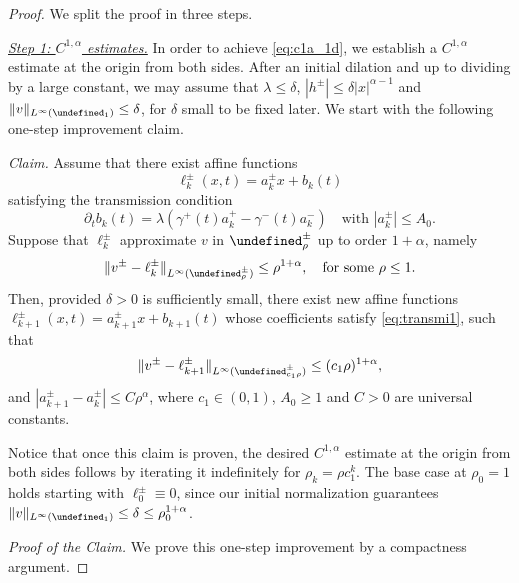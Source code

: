 \documentclass[12pt]{article}
\let\P\undefined
\numberwithin{Theorem}{section}
\theoremstyle{definition}
\theoremstyle{remark}
\numberwithin{equation}{section}
\newcommand{\p}{\partial}
\newcommand{\P}{\mathcal{P}}
\begin{document}
\begin{proof} We split the proof in three steps. 

\smallskip
\underline{ \it Step 1: $C^{1,{ \alpha}}$ estimates.} In order to achieve \eqref{eq:c1a_1d}, we establish a $C^{1,{ \alpha}}$ estimate at the origin from both sides. After an initial dilation and up to dividing by a large constant, we may assume that $\lambda \leq \delta$, $|h^\pm| \leq \delta |x|^{{ \alpha}-1}$ and $\|v \|_{L^{\infty}(\P_1)} \leq \delta$, for $\delta$ small to be fixed later.
We start with the following one-step improvement claim.

\textit{Claim.} Assume that there exist affine functions
$$
\ell^\pm_k(x, t) = a^\pm_k x + b_k(t)
$$
satisfying the transmission condition
\begin{equation} \label{eq:transmi1}
\p_t b_k(t) = \lambda(\gamma^+(t)a^+_k - \gamma^-(t)a_k^-) \quad  \text{with $|a^\pm_k| \le A_0$.}
\end{equation}
Suppose that $\ell^\pm_k$ approximate $v$ in $\P^\pm_\rho$ up to order $1+{ \alpha}$, namely
\[\|v^\pm - \ell^\pm_k\|_{L^\infty(\P^\pm_\rho)} \le \rho^{1+{ \alpha}}, \quad \text{for some } \rho \le 1.
\]
Then, provided $\delta > 0$ is sufficiently small, there exist new affine functions $\ell^\pm_{k+1}(x, t) = a^\pm_{k+1} x + b_{k+1}(t)$ whose coefficients satisfy \eqref{eq:transmi1}, such that
\[
\|v^\pm - \ell^\pm_{k+1}\|_{L^\infty(\P^\pm_{c_1\rho})} \le (c_1\rho)^{1+{ \alpha}},
\]
and $|a^\pm_{k+1} - a^\pm_k| \le C\rho^{ \alpha}$, where $c_1 \in (0, 1)$, $A_0 \ge 1$ and $C > 0$ are universal constants.

Notice that once this claim is proven, the desired $C^{1,{ \alpha}}$ estimate at the origin from both sides follows by iterating it indefinitely for $\rho_k = \rho c_1^k$. The base case at $\rho_0 = 1$ holds starting with $\ell^\pm_0 \equiv 0$, since our initial normalization guarantees $\|v\|_{L^\infty(\P_1)} \le \delta \le \rho_0^{1+\alpha}$.

\textit{Proof of the Claim.} We prove this one-step improvement by a compactness argument. 


\end{proof}
\end{document}
